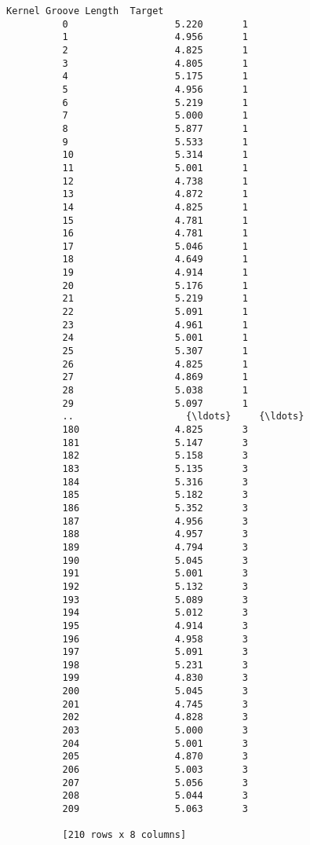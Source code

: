 \documentclass[11pt]{article}
\begin{document}
\begin{Verbatim}[commandchars=\\\{\}]
               Kernel Groove Length  Target  
          0                   5.220       1  
          1                   4.956       1  
          2                   4.825       1  
          3                   4.805       1  
          4                   5.175       1  
          5                   4.956       1  
          6                   5.219       1  
          7                   5.000       1  
          8                   5.877       1  
          9                   5.533       1  
          10                  5.314       1  
          11                  5.001       1  
          12                  4.738       1  
          13                  4.872       1  
          14                  4.825       1  
          15                  4.781       1  
          16                  4.781       1  
          17                  5.046       1  
          18                  4.649       1  
          19                  4.914       1  
          20                  5.176       1  
          21                  5.219       1  
          22                  5.091       1  
          23                  4.961       1  
          24                  5.001       1  
          25                  5.307       1  
          26                  4.825       1  
          27                  4.869       1  
          28                  5.038       1  
          29                  5.097       1  
          ..                    {\ldots}     {\ldots}  
          180                 4.825       3  
          181                 5.147       3  
          182                 5.158       3  
          183                 5.135       3  
          184                 5.316       3  
          185                 5.182       3  
          186                 5.352       3  
          187                 4.956       3  
          188                 4.957       3  
          189                 4.794       3  
          190                 5.045       3  
          191                 5.001       3  
          192                 5.132       3  
          193                 5.089       3  
          194                 5.012       3  
          195                 4.914       3  
          196                 4.958       3  
          197                 5.091       3  
          198                 5.231       3  
          199                 4.830       3  
          200                 5.045       3  
          201                 4.745       3  
          202                 4.828       3  
          203                 5.000       3  
          204                 5.001       3  
          205                 4.870       3  
          206                 5.003       3  
          207                 5.056       3  
          208                 5.044       3  
          209                 5.063       3  
          
          [210 rows x 8 columns]
\end{Verbatim}
            
\end{document}
